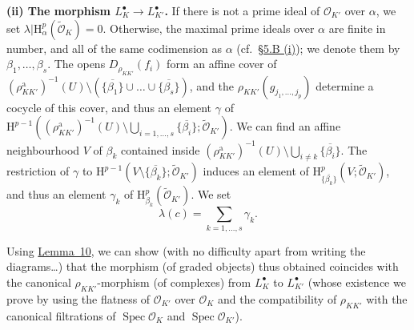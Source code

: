 \documentclass[british]{article}
\newenvironment{rmenv}[1]
  {\phantomsection\par\smallskip\noindent\textbf{#1.}\rmfamily}
  {\par\smallskip}
\begin{document}
\begin{rmenv}{(ii) The morphism $L_K^\bullet\to L_{K'}^\bullet$}
If there is not a prime ideal of \({\mathscr{O}}_{K'}\) over \(\alpha\),
we set \(\lambda|\mathrm{H}_\alpha^p(\widetilde{{\mathscr{O}}}_K)=0\).
Otherwise, the maximal prime ideals over \(\alpha\) are finite in
number, and all of the same codimension as \(\alpha\)
(cf.~\hyperref[section-5.b.i]{§5.B (i)}); we denote them by
\(\beta_1,\ldots,\beta_s\). The opens \(D_{\rho_{KK'}}(f_i)\) form an
affine cover of
\((\rho_{KK'}^\mathrm{a})^{-1}(U)\setminus(\overline{\{\beta_1\}}\cup\ldots\cup\overline{\{\beta_s\}})\),
and the \(\rho_{KK'}(g_{j_1,\ldots,j_p})\) determine a cocycle of this
cover, and thus an element \(\gamma\) of
\(\mathrm{H}^{p-1}((\rho_{KK'}^\mathrm{a})^{-1}(U)\setminus\bigcup_{i=1,\ldots,s}\overline{\{\beta_i\}};\widetilde{{\mathscr{O}}}_{K'})\).
We can find an affine neighbourhood \(V\) of \(\beta_k\) contained
inside
\((\rho_{KK'}^\mathrm{a})^{-1}(U)\setminus\bigcup_{i\neq k}\overline{\{\beta_i\}}\).
The restriction of \(\gamma\) to
\(\mathrm{H}^{p-1}(V\setminus\overline{\{\beta_k\}};\widetilde{{\mathscr{O}}}_{K'})\)
induces an element of
\(\mathrm{H}_{\overline{\{\beta_k\}}}^p(V;\widetilde{{\mathscr{O}}}_{K'})\),
and thus an element \(\gamma_k\) of
\(\mathrm{H}_{\beta_k}^p(\widetilde{{\mathscr{O}}}_{K'})\). We set \[
  \lambda(c)
  = \sum_{k=1,\ldots,s} \gamma_k.
\]

Using \hyperref[lemma-10]{Lemma~10}, we can show (with no difficulty
apart from writing the diagrams\ldots) that the morphism (of graded
objects) thus obtained coincides with the canonical
\(\rho_{KK'}\)-morphism (of complexes) from \(L_K^\bullet\) to
\(L_{K'}^\bullet\) (whose existence we prove by using the flatness of
\({\mathscr{O}}_{K'}\) over \({\mathscr{O}}_K\) and the compatibility of
\(\rho_{KK'}\) with the canonical filtrations of
\(\operatorname{Spec}{{\mathscr{O}}_K}\) and
\(\operatorname{Spec}{{\mathscr{O}}_{K'}}\)).

\end{rmenv}
\end{document}
